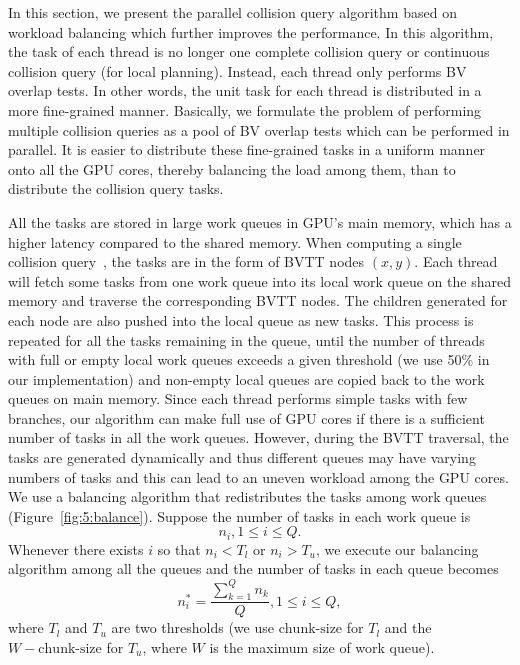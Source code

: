 In this section, we present the parallel collision query algorithm based on workload balancing which further improves the performance. In this algorithm, the task of each thread is no longer one complete collision query or continuous collision query
(for local planning). Instead, each thread only performs BV overlap tests. In other words, the unit task for each thread
is distributed in a more fine-grained manner. Basically, we formulate the problem of performing multiple collision queries as a pool of BV overlap tests which can be performed in parallel. It is easier to distribute these fine-grained tasks in a uniform manner onto all the GPU cores, thereby balancing the load among them, than to distribute the collision query tasks.

All the tasks are stored in large work queues in GPU's main memory, which has a higher latency compared
to the shared memory. When computing a single collision query~\cite{Lauterbach10}, the tasks are in the form of
BVTT nodes $(x,y)$. Each thread will fetch some tasks from one work queue into its local work queue on the
shared memory and traverse the corresponding BVTT nodes. The children generated for each node are also pushed
into the local queue as new tasks. This process is repeated for all the tasks remaining in the queue,
until the number of threads with full or empty local work queues exceeds a given threshold (we use 50\%
in our implementation) and non-empty local queues are copied back to the work queues on main memory.
Since each thread performs simple tasks with few branches, our algorithm can make full use of GPU cores
if there is a sufficient number of tasks in all the work queues. However, during the BVTT traversal, the tasks
are generated dynamically and thus different queues may have varying numbers of tasks and this can lead to an uneven workload among the GPU cores. We use a balancing algorithm that redistributes the tasks among work queues (Figure~\ref{fig:5:balance}). Suppose the number of tasks in each work queue is $$n_i, 1\leq i \leq Q.$$ Whenever there exists $i$ so that $n_i < T_l$ or $n_i > T_u$, we execute our balancing algorithm among all the queues and the number of tasks in each queue becomes $$n_i^* = \frac{\sum_{k=1}^Q n_k}{Q}, 1\leq i \leq Q,$$ where $T_l$ and $T_u$ are two thresholds (we use $\text{chunk-size}$ for $T_l$ and the $W-\text{chunk-size}$ for $T_u$, where $W$ is the maximum size of work queue).

